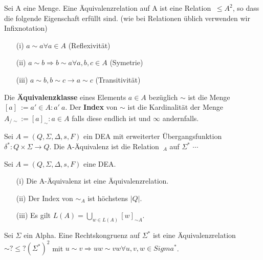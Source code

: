  Sei A eine Menge. Eine Äquivalenzrelation auf A ist eine Relation $~ \leq A^{2}$, so dass die folgende Eigenschaft erfüllt sind. (wie bei Relationen üblich verwenden wir Infixnotation)
\begin{itemize}
    \item [(i)] $a \sim a \forall a \in A $ (Reflexivität)
    \item [(ii)] $a \sim b \Rightarrow  b \sim a \forall a, b, c \in A$ (Symetrie)
    \item [(iii)] $a \sim b, b \sim c \rightarrow a \sim c$ (Transitivität)
\end{itemize}
Die \textbf{Äquivalenzklasse} eines Elements $a \in A$ bezüglich $\sim$ ist die Menge $[a]_{~} := {a' \in A : a' ~a}$. Der \textbf{Index} von $\sim$ ist die Kardinalität der Menge $A_{/\sim} := {[a]_{\sim} : a \in A}$ falls diese endlich ist und $\infty$  andernfalls.

 Sei $A = (Q, \Sigma, \Delta, s, F)$ ein DEA mit erweiterter Übergangsfunktion 
$\delta^{*}: Q \times \Sigma \rightarrow Q$. Die A-Äquivalenz ist die Relation $~_A$ auf $\Sigma^{*}$
$\cdots$

 Sei $A = (Q, \Sigma, \Delta, s, F)$ eine DEA.
\begin{itemize}
    \item [(i)] Die A-Äquivalenz ist eine Äquivalenzrelation.
    \item [(ii)] Der Index von $\sim_{A}$ ist höchstens $|Q|$.
    \item [(iii)] Es gilt $L(A) = \bigcup \limits_{w \in L(A)} [w]_{\sim A}$.
\end{itemize}

 Sei $\Sigma$ ein Alpha. Eine Rechtskongruenz auf $\Sigma^{*}$ ist eine Äquivalenzrelation $\sim ?\leq ?(\Sigma^{*})^{2}$ mit $u \sim v \Rightarrow uw \sim vw \forall u, v, w \in Sigma^{*}$.

